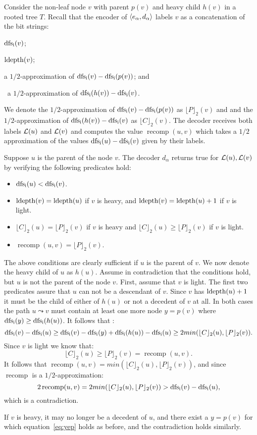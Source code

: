Consider the non-leaf  node $v$ with parent $p(v)$ and heavy child $h(v)$ in a rooted tree $T$.
 Recall that the encoder of $\left \langle e_\alpha,d_\alpha \right \rangle $ labels $v$ as a concatenation of  the bit strings:
\begin{inparaenum}
  \item{$\operatorname{dfs_i}(v)$};
 \item $\operatorname{ldepth}(v)$;
 \item a $1/2$-approximation of $\operatorname{dfs_i}(v)-\operatorname{dfs_i}(p(v))$; and
\item~a $1/2$-approximation of $\operatorname{dfs_i}(h(v))-\operatorname{dfs_i}(v)$.
 \end{inparaenum}
 

\newcommand{\recomp}{\operatorname{recomp}}
\newcommand{\pprox}{\lfloor P \rfloor _2}
\newcommand{\cprox}{\lfloor C \rfloor _2}


 We denote the $1/2$-approximation of $\operatorname{dfs_i}(v)-\operatorname{dfs_i}(p(v))$  as $\pprox(v)$  and  and  the $1/2$-approximation of $\operatorname{dfs_i}(h(v))-\operatorname{dfs_i}(v)$ as $\cprox(v)$.
 The decoder receives both labels $ \mathcal{L}(u)$ and $ \mathcal{L}(v)$ and  computes the value  $\recomp(u,v)$ which takes a $1/2$ approximation of the values 
 $\operatorname{dfs_i}(u)-\operatorname{dfs_i}(v)$ given by their labels.
 
 

Suppose  $u$ is  the  parent of the node   $v$.
The decoder  $d_\alpha$ returns true for  $ \mathcal{L}(u), \mathcal{L}(v)$ by verifying  the following predicates hold:
\begin{itemize}
\item $\operatorname{dfs_i}(u)< \operatorname{dfs_i}(v)$.
\item $\operatorname{ldepth}(v) = \operatorname{ldepth}(u)$ if $v$ is heavy, and $\operatorname{ldepth}(v) = \operatorname{ldepth}(u)+1$ if $v$ is light.
\item  $ \cprox(u) = \pprox(v)  $ if $v$ is heavy and $ \cprox(u) \geq \pprox(v)  $ if $v$ is light.
\item   $\recomp(u,v) =  \pprox(v)$.
\end{itemize}

 The above conditions are clearly sufficient if $u$ is the parent of $v$.
 We now denote the heavy child of $u$ as $h(u)$.
Assume in contradiction that the conditions hold, but $u$ is not the parent of  the node $v$. 
First, assume that $v$ is light. 
The first  two predicates assure that $u$ can not be a descendant of $v$. 
Since $v$ has $\operatorname{ldepth}(u)+1$ it must be the child of either of $h(u)$ or not a decedent of $v$ at all.
In both cases the path $u \leadsto v$ must contain at least one more node $y= p(v)$ where $\operatorname{dfs_i}(y) \geq \operatorname{dfs_i}(h(u))$.
It follows that : 
\begin{equation}\label{eq:yep}
\dfsi(v)-\dfsi(u) \geq  \dfsi(v)- \dfsi(y) + \dfsi(h(u))- \dfsi(u) \geq 2 min(\cprox(u),\pprox(v)).
\end{equation}
Since $v$ is light we know that:
$$\cprox(u) \geq \pprox(v) = \recomp(u,v).$$
It follows that  $\recomp(u,v) = min(\cprox(u),\pprox(v))$, and since $\recomp$ is a $1/2$-approximation:
 $$2 \recomp(u,v) =  2 min(\cprox(u),\pprox(v)) > \dfsi(v)-\dfsi(u),$$
 which is a contradiction.
 
 If $v$ is heavy, it may no longer be a decedent of $u$, and there exist a $y = p(v)$ for which equation~\ref{eq:yep} holds as before, and the contradiction holds similarly.  
